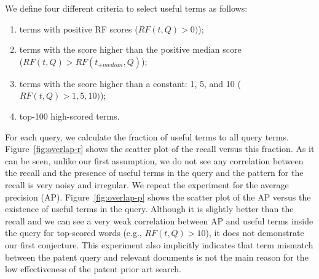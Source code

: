 We define four different criteria to select useful terms as follows:
\begin{enumerate}
\item terms with positive RF scores ($ RF(t, Q)>0) $);
\item terms with the score higher than the positive median score\\ ($ RF(t, Q)>RF(t_{+median}, Q) $);
\item terms with the score higher than a constant: 1, 5, and 10 ($ RF(t, Q)>1, 5, 10) $);
\item top-100 high-scored terms.
\end{enumerate}
For each query, we calculate the fraction of useful terms to all query terms. 
Figure~\ref{fig:overlap-r} shows the scatter plot of the recall versus this fraction. 
As it can be seen, unlike our first assumption, we do not see any correlation between the recall and the presence of useful terms in the query and the pattern for the recall is very noisy and irregular. 
We repeat the experiment for the average precision (AP). Figure~\ref{fig:overlap-p} shows the scatter plot of the AP versus the existence of useful terms in the query. Although it is slightly better than the recall and we can see a very weak correlation between AP and useful terms inside the query for top-scored words (e.g., $RF(t, Q)>10$), it does not demonstrate our first conjecture. 
This experiment also implicitly indicates that term mismatch between the patent query and relevant documents is 
not the main reason for the low effectiveness of the patent prior art search. 
